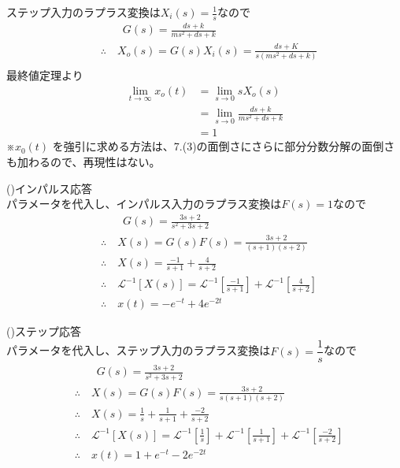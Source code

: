 \documentclass[a4paper,12pt]{article}
\begin{document}
\begin{tcolorbox}[title={7.(4)ステップ入力を印加した際の定常値を求めよ。
    }]
        ステップ入力のラプラス変換は\(X_i(s)=\frac{1}{s}\)なので
    \vspace{-2mm}
    \begin{align*}
        &\qquad G(s) = \frac{d s + k}{m s^2 + d s + k} \\
        &\therefore \quad X_o(s) = G(s) X_i(s) = \frac{d s + K}{s(m s^2 + d s + k)}\\
    \end{align*}
    最終値定理より
    \begin{align*}
    \lim_{t \to \infty} x_o(t) &= \lim_{s \to 0} sX_o(s) \\
        &= \lim_{s \to 0} \frac{d s + k}{m s^2 + d s + k} \\
        &= 1
    \end{align*}
※\(x_0(t)\) を強引に求める方法は、7.(3)の面倒さにさらに部分分数分解の面倒さも加わるので、再現性はない。
\end{tcolorbox}
\begin{tcolorbox}[title={7.(5)\quad \( m=1,d=3,k=2\)とし、インパルス応答、ステップ応答をそれぞれ求めよ。
    }]
    (\uppercase\expandafter{})インパルス応答 \\
    パラメータを代入し、インパルス入力のラプラス変換は\(F(s)=1\)なので
    \vspace{-2mm}
    \begin{align*}
        &\qquad G(s) = \frac{3 s + 2}{s^2 + 3 s + 2} \\
        &\therefore \quad X(s) = G(s) F(s) = \frac{3 s + 2}{(s+1)(s+2)} \\
        &\therefore \quad X(s) = \frac{-1}{s+1} + \frac{4}{s+2} \\
        &\therefore \quad \mathcal{L}^{-1} \left[ X(s)\right] 
        = \mathcal{L}^{-1} \left[\frac{-1}{s+1}\right] 
        + \mathcal{L}^{-1} \left[\frac{4}{s+2} \right] \\
        &\therefore \quad x(t) = -e^{-t} + 4 e^{-2t}
    \end{align*}

    (\uppercase\expandafter{})ステップ応答 \\
    パラメータを代入し、ステップ入力のラプラス変換は\(F(s)=\dfrac{1}{s}\)なので
    \vspace{-2mm}
    \begin{align*}
        &\qquad G(s) = \frac{3 s + 2}{s^2 + 3 s + 2} \\
        &\therefore \quad X(s) = G(s) F(s) = \frac{3 s + 2}{s(s+1)(s+2)} \\
        &\therefore \quad X(s) = \frac{1}{s}+\frac{1}{s+1} + \frac{-2}{s+2} \\
        &\therefore \quad \mathcal{L}^{-1} \left[ X(s)\right] 
        = \mathcal{L}^{-1} \left[\frac{1}{s}\right] 
        + \mathcal{L}^{-1} \left[\frac{1}{s+1} \right]
        + \mathcal{L}^{-1} \left[\frac{-2}{s+2} \right] \\
        &\therefore \quad x(t) = 1 + e^{-t} -2 e^{-2t}
    \end{align*}
\end{tcolorbox}
\end{document}
